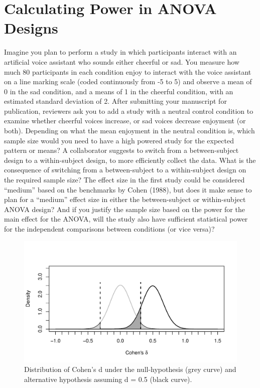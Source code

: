 \documentclass[,jou, draftfirst, a4paper,floatsintext]{apa6}
\begin{document}
\hypertarget{calculating-power-in-anova-designs}{%
\section{Calculating Power in ANOVA Designs}\label{calculating-power-in-anova-designs}}

Imagine you plan to perform a study in which participants interact with an artificial voice assistant who sounds either cheerful or sad.
You measure how much 80 participants in each condition enjoy to interact with the voice assistant on a line marking scale (coded continuously from -5 to 5) and observe a mean of 0 in the sad condition, and a means of 1 in the cheerful condition, with an estimated standard deviation of 2.
After submitting your manuscript for publication, reviewers ask you to add a study with a neutral control condition to examine whether cheerful voices increase, or sad voices decrease enjoyment (or both).
Depending on what the mean enjoyment in the neutral condition is, which sample size would you need to have a high powered study for the expected pattern or means?
A collaborator suggests to switch from a between-subject design to a within-subject design, to more efficiently collect the data.
What is the consequence of switching from a between-subject to a within-subject design on the required sample size?
The effect size in the first study could be considered \enquote{medium} based on the benchmarks by Cohen (1988), but does it make sense to plan for a \enquote{medium} effect size in either the between-subject or within-subject ANOVA design?
And if you justify the sample size based on the power for the main effect for the ANOVA, will the study also have sufficient statistical power for the independent comparisons between conditions (or vice versa)?

\begin{figure}
\centering
\includegraphics{0.1_Simulation_Based_Power_Analysis_For_Factorial_ANOVA_Designs_files/figure-latex/d-plot-1.pdf}
\caption{\label{fig:d-plot}Distribution of Cohen's d under the null-hypothesis (grey curve) and alternative hypothesis assuming d = 0.5 (black curve).}
\end{figure}
\end{document}
